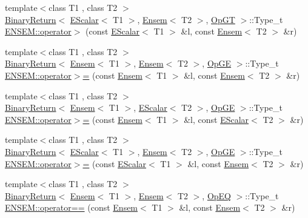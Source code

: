\begin{DoxyCompactItemize}
\item 
{\footnotesize template$<$class T1 , class T2 $>$ }\\\mbox{\hyperlink{structENSEM_1_1BinaryReturn}{Binary\+Return}}$<$ \mbox{\hyperlink{classENSEM_1_1EScalar}{E\+Scalar}}$<$ T1 $>$, \mbox{\hyperlink{classENSEM_1_1Ensem}{Ensem}}$<$ T2 $>$, \mbox{\hyperlink{structENSEM_1_1OpGT}{Op\+GT}} $>$\+::Type\+\_\+t \mbox{\hyperlink{group__eensem_gaf81a55e62404e9b802fbb90aaee678ea}{E\+N\+S\+E\+M\+::operator$>$}} (const \mbox{\hyperlink{classENSEM_1_1EScalar}{E\+Scalar}}$<$ T1 $>$ \&l, const \mbox{\hyperlink{classENSEM_1_1Ensem}{Ensem}}$<$ T2 $>$ \&r)
\item 
{\footnotesize template$<$class T1 , class T2 $>$ }\\\mbox{\hyperlink{structENSEM_1_1BinaryReturn}{Binary\+Return}}$<$ \mbox{\hyperlink{classENSEM_1_1Ensem}{Ensem}}$<$ T1 $>$, \mbox{\hyperlink{classENSEM_1_1Ensem}{Ensem}}$<$ T2 $>$, \mbox{\hyperlink{structENSEM_1_1OpGE}{Op\+GE}} $>$\+::Type\+\_\+t \mbox{\hyperlink{group__eensem_gab4cf01cccb06cf4c911567c3ee6eb808}{E\+N\+S\+E\+M\+::operator$>$=}} (const \mbox{\hyperlink{classENSEM_1_1Ensem}{Ensem}}$<$ T1 $>$ \&l, const \mbox{\hyperlink{classENSEM_1_1Ensem}{Ensem}}$<$ T2 $>$ \&r)
\item 
{\footnotesize template$<$class T1 , class T2 $>$ }\\\mbox{\hyperlink{structENSEM_1_1BinaryReturn}{Binary\+Return}}$<$ \mbox{\hyperlink{classENSEM_1_1Ensem}{Ensem}}$<$ T1 $>$, \mbox{\hyperlink{classENSEM_1_1EScalar}{E\+Scalar}}$<$ T2 $>$, \mbox{\hyperlink{structENSEM_1_1OpGE}{Op\+GE}} $>$\+::Type\+\_\+t \mbox{\hyperlink{group__eensem_gaefcc523be9266958f63fc6b34c2671e8}{E\+N\+S\+E\+M\+::operator$>$=}} (const \mbox{\hyperlink{classENSEM_1_1Ensem}{Ensem}}$<$ T1 $>$ \&l, const \mbox{\hyperlink{classENSEM_1_1EScalar}{E\+Scalar}}$<$ T2 $>$ \&r)
\item 
{\footnotesize template$<$class T1 , class T2 $>$ }\\\mbox{\hyperlink{structENSEM_1_1BinaryReturn}{Binary\+Return}}$<$ \mbox{\hyperlink{classENSEM_1_1EScalar}{E\+Scalar}}$<$ T1 $>$, \mbox{\hyperlink{classENSEM_1_1Ensem}{Ensem}}$<$ T2 $>$, \mbox{\hyperlink{structENSEM_1_1OpGE}{Op\+GE}} $>$\+::Type\+\_\+t \mbox{\hyperlink{group__eensem_ga08b4c51fd25a40dd1d20e6138378a63d}{E\+N\+S\+E\+M\+::operator$>$=}} (const \mbox{\hyperlink{classENSEM_1_1EScalar}{E\+Scalar}}$<$ T1 $>$ \&l, const \mbox{\hyperlink{classENSEM_1_1Ensem}{Ensem}}$<$ T2 $>$ \&r)
\item 
{\footnotesize template$<$class T1 , class T2 $>$ }\\\mbox{\hyperlink{structENSEM_1_1BinaryReturn}{Binary\+Return}}$<$ \mbox{\hyperlink{classENSEM_1_1Ensem}{Ensem}}$<$ T1 $>$, \mbox{\hyperlink{classENSEM_1_1Ensem}{Ensem}}$<$ T2 $>$, \mbox{\hyperlink{structENSEM_1_1OpEQ}{Op\+EQ}} $>$\+::Type\+\_\+t \mbox{\hyperlink{group__eensem_ga8f2413d9b23131f67cbe4d3bd222e0ec}{E\+N\+S\+E\+M\+::operator==}} (const \mbox{\hyperlink{classENSEM_1_1Ensem}{Ensem}}$<$ T1 $>$ \&l, const \mbox{\hyperlink{classENSEM_1_1Ensem}{Ensem}}$<$ T2 $>$ \&r)

\end{DoxyCompactItemize}
